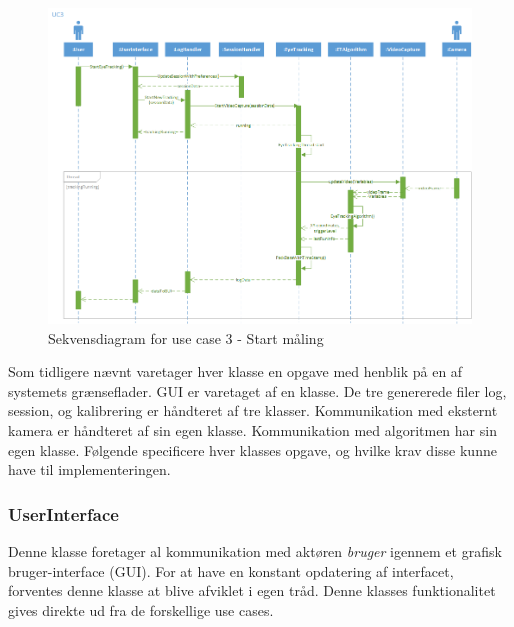 \documentclass[rapport.tex]{subfiles}
\begin{document}
	\begin{figure}
		\centering
		\includegraphics[width=1\linewidth]{UC3}
		\caption[Sekvensdiagram - UC3]{Sekvensdiagram for use case 3 - Start måling}
		\label{fig:UCseq3}
	\end{figure}
	
	
	
	Som tidligere nævnt varetager hver klasse en opgave med henblik på en af systemets grænseflader. GUI er varetaget af en klasse. De tre genererede filer log, session, og kalibrering er håndteret af tre klasser. Kommunikation med eksternt kamera er håndteret af sin egen klasse. Kommunikation med algoritmen har sin egen klasse. Følgende specificere hver klasses opgave, og hvilke krav disse kunne have til implementeringen. 
		\subsubsection{UserInterface}
		Denne klasse foretager al kommunikation med aktøren \textit{bruger} igennem et grafisk bruger-interface (GUI). For at have en konstant opdatering af interfacet, forventes denne klasse at blive afviklet i egen tråd. Denne klasses funktionalitet gives direkte ud fra de forskellige use cases. 
	
		
\end{document}
